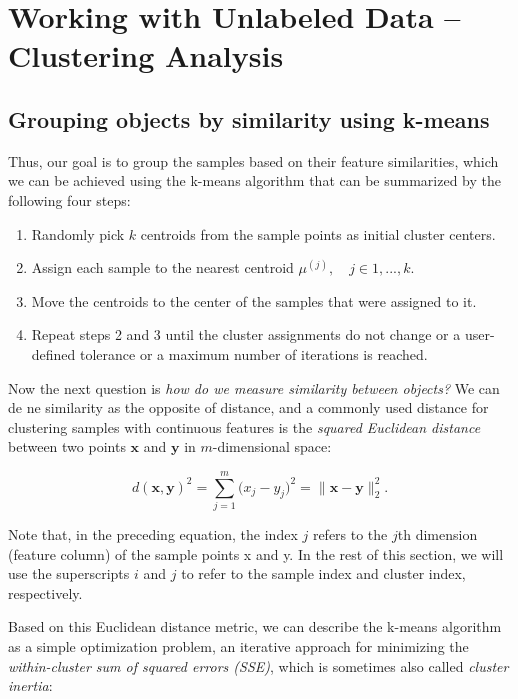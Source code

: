 \documentclass[letterpaper]{report}
\begin{document}

\chapter{Working with Unlabeled Data -- Clustering Analysis}


\section{Grouping objects by similarity using k-means}

Thus, our goal is to group the samples based on their feature similarities, which we can be achieved using the k-means algorithm that can be summarized by the following four steps:

\begin{enumerate}
\item Randomly pick $k$ centroids from the sample points as initial cluster centers.
\item Assign each sample to the nearest centroid $\mu^{(j)}, \quad j \in {1, ..., k}.$
\item Move the centroids to the center of the samples that were assigned to it.
\item Repeat steps 2 and 3 until the cluster assignments do not change or a user-defined tolerance or a maximum number of iterations is reached.
\end{enumerate}

Now the next question is \textit{how do we measure similarity between objects?} We can de ne similarity as the opposite of distance, and a commonly used distance for clustering samples with continuous features is the \textit{squared Euclidean distance} between two points $\mathbf{x}$ and $\mathbf{y}$ in $m$-dimensional space:

\[
d(\mathbf{x}, \mathbf{y})^2 = \sum_{j=1}^{m} \big(x_j - y_j \big)^2 = \lVert \mathbf{x} - \mathbf{y} \rVert^{2}_{2}.
\]

Note that, in the preceding equation, the index $j$ refers to the $j$th dimension
(feature column) of the sample points x and y. In the rest of this section, we will use the superscripts $i$ and $j$ to refer to the sample index and cluster index, respectively.


Based on this Euclidean distance metric, we can describe the k-means algorithm
as a simple optimization problem, an iterative approach for minimizing the \textit{within-cluster sum of squared errors (SSE)}, which is sometimes also called \textit{cluster inertia}:
\end{document}
